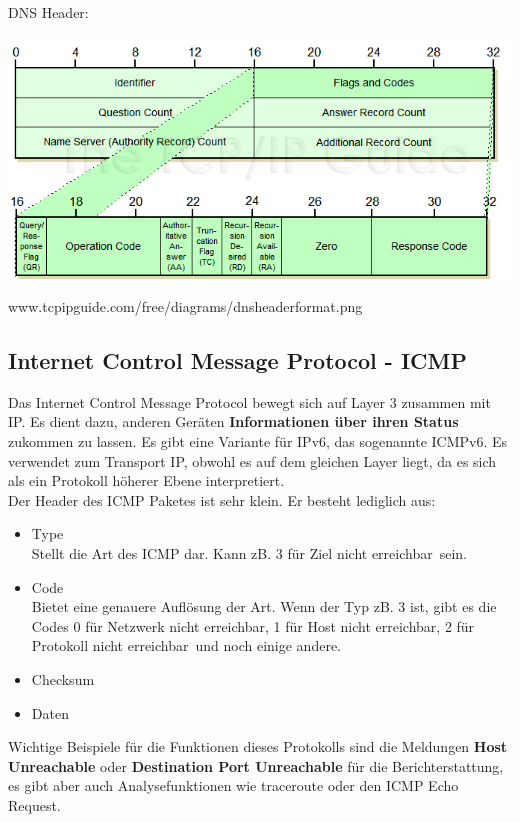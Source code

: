 \documentclass[12pt,a4paper]{report}
\begin{document}
\begin{onehalfspace}
DNS Header:\\
\begin{center}
\includegraphics[scale=0.7]{../docs/tarkes/pics/dnsheader.png}
\begin{scriptsize}
www.tcpipguide.com/free/diagrams/dnsheaderformat.png
\end{scriptsize}
\end{center}
\subsection{Internet Control Message Protocol - ICMP}
Das Internet Control Message Protocol bewegt sich auf Layer 3 zusammen mit IP. Es dient dazu, anderen Geräten \textbf{Informationen über ihren Status} zukommen zu lassen. Es gibt eine Variante für IPv6, das sogenannte ICMPv6. Es verwendet zum Transport IP, obwohl es auf dem gleichen Layer liegt, da es sich als ein Protokoll höherer Ebene interpretiert.\\

Der Header des ICMP Paketes ist sehr klein. Er besteht lediglich aus:
\begin{itemize}
\item Type\\
Stellt die Art des ICMP dar. Kann zB. 3 für \glqq Ziel nicht erreichbar\grqq \ sein.
\item Code\\
Bietet eine genauere Auflösung der Art. Wenn der Typ zB. 3 ist, gibt es die Codes 0 für \glqq Netzwerk nicht erreichbar\grqq , 1 für \glqq Host nicht erreichbar\grqq , 2 für \glqq Protokoll nicht erreichbar\grqq \ und noch einige andere.
\item Checksum
\item Daten
\end{itemize}

Wichtige Beispiele für die Funktionen dieses Protokolls sind die Meldungen \textbf{Host Unreachable} oder \textbf{Destination Port Unreachable} für die Berichterstattung, es gibt aber auch Analysefunktionen wie traceroute oder den ICMP Echo Request. 

\end{onehalfspace}
\end{document}
